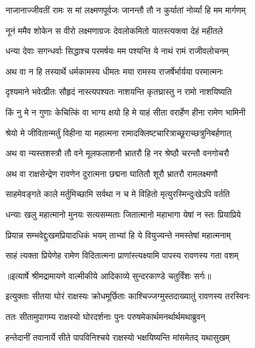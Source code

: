 \twolineshloka
{नाजानाज्जीवतीं रामः स मां लक्ष्मणपूर्वजः}
{जानन्तौ तौ न कुर्यातां नोर्व्यां हि मम मार्गणम्} %

\twolineshloka
{नूनं ममैव शोकेन स वीरो लक्ष्मणाग्रजः}
{देवलोकमितो यातस्त्यक्त्वा देहं महीतले} %

\twolineshloka
{धन्या देवाः सगन्धर्वाः सिद्धाश्च परमर्षयः}
{मम पश्यन्ति ये नाथं रामं राजीवलोचनम्} %

\twolineshloka
{अथ वा न हि तस्यार्थे धर्मकामस्य धीमतः}
{मया रामस्य राजर्षेर्भार्यया परमात्मनः} %

\twolineshloka
{दृश्यमाने भवेत्प्रीतः सौहृदं नास्त्यपश्यतः}
{नाशयन्ति कृतघ्रास्तु न रामो नाशयिष्यति} %

\twolineshloka
{किं नु मे न गुणाः केचित्किं वा भाग्य क्षयो हि मे}
{याहं सीता वरार्हेण हीना रामेण भामिनी} %

\twolineshloka
{श्रेयो मे जीवितान्मर्तुं विहीना या महात्मना}
{रामादक्लिष्टचारित्राच्छूराच्छत्रुनिबर्हणात्} %

\twolineshloka
{अथ वा न्यस्तशस्त्रौ तौ वने मूलफलाशनौ}
{भ्रातरौ हि नर श्रेष्ठौ चरन्तौ वनगोचरौ} %

\twolineshloka
{अथ वा राक्षसेन्द्रेण रावणेन दुरात्मना}
{छद्मना घातितौ शूरौ भ्रातरौ रामलक्ष्मणौ} %

\twolineshloka
{साहमेवङ्गते काले मर्तुमिच्छामि सर्वथा}
{न च मे विहितो मृत्युरस्मिन्दुःखेऽपि वर्तति} %

\twolineshloka
{धन्याः खलु महात्मानो मुनयः सत्यसम्मताः}
{जितात्मानो महाभागा येषां न स्तः प्रियाप्रिये} %

\twolineshloka
{प्रियान्न सम्भवेद्दुःखमप्रियादधिकं भयम्}
{ताभ्यां हि ये वियुज्यन्ते नमस्तेषां महात्मनाम्} %

\twolineshloka
{साहं त्यक्ता प्रियेणेह रामेण विदितात्मना}
{प्राणांस्त्यक्ष्यामि पापस्य रावणस्य गता वशम्} %


{॥इत्यार्षे श्रीमद्रामायणे वाल्मीकीये आदिकाव्ये सुन्दरकाण्डे चतुर्विंशः सर्गः॥}


\twolineshloka
{इत्युक्ताः सीतया घोरं राक्षस्यः क्रोधमूर्छिताः}
{काश्चिज्जग्मुस्तदाख्यातुं रावणस्य तरस्विनः} %

\twolineshloka
{ततः सीतामुपागम्य राक्षस्यो घोरदर्शनाः}
{पुनः परुषमेकार्थमनर्थार्थमथाब्रुवन्} %

\twolineshloka
{हन्तेदानीं तवानार्ये सीते पापविनिश्चये}
{राक्षस्यो भक्षयिष्यन्ति मांसमेतद् यथासुखम्} %

